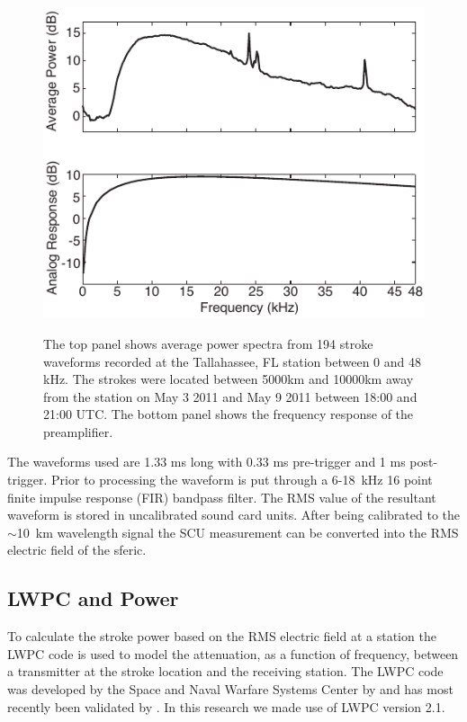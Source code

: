\begin{figure}[ht!]
\centering
\includegraphics[scale=1]{energy/Figures/PPS_Spectra.pdf}\\
\caption{The top panel shows average power spectra from 194 stroke waveforms recorded at the Tallahassee, FL station between 0 and 48 kHz. The strokes were located between 5000km and 10000km away from the  station on May 3 2011 and May 9 2011 between 18:00 and 21:00 UTC. The bottom panel shows the frequency response of the preamplifier.}
\label{energy:fig:average_spectra}
\end{figure}

The waveforms used are 1.33 ms long with 0.33 ms pre-trigger and 1 ms post-trigger.
Prior to processing the waveform is put through a 6-18~kHz 16 point finite impulse response (FIR) bandpass filter.
The RMS value of the resultant waveform is stored in uncalibrated sound card units.
After being calibrated to the $\sim$10~km wavelength signal the SCU measurement can be converted into the RMS electric field of the sferic. 

\subsection{LWPC and Power}


To calculate the stroke power based on the RMS electric field at a station the LWPC code is used to model the attenuation, as a function of frequency, between a transmitter at the stroke location and the receiving station.
The LWPC code was developed by the Space and Naval Warfare Systems Center by \citet{Ferguson1998} and has most recently been validated by \citet{Thomson2011}.
In this research we made use of LWPC version 2.1.

